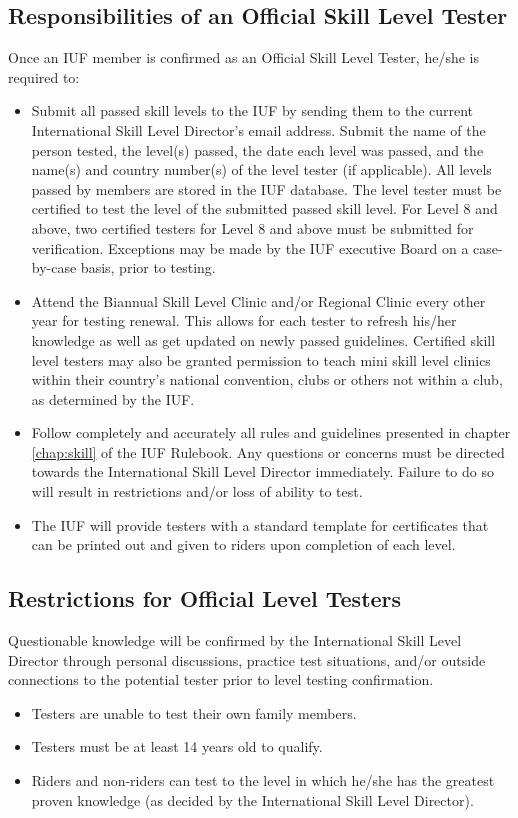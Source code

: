 \subsection{Responsibilities of an Official Skill Level Tester}
Once an IUF member is confirmed as an Official Skill Level Tester, he/she is required to:
\begin{itemize}
\item Submit all passed skill levels to the IUF by sending them to the current International Skill Level Director's email address.
Submit the name of the person tested, the level(s) passed, the date each level was passed, and the name(s) and country number(s) of the level tester (if applicable).
All levels passed by members are stored in the IUF database.
The level tester must be certified to test the level of the submitted passed skill level.
For Level 8 and above, two certified testers for Level 8 and above must be submitted for verification.
Exceptions may be made by the IUF executive Board on a case-by-case basis, prior to testing.
\item Attend the Biannual Skill Level Clinic and/or Regional Clinic every other year for testing renewal.
This allows for each tester to refresh his/her knowledge as well as get updated on newly passed guidelines.
Certified skill level testers may also be granted permission to teach mini skill level clinics within their country's national convention, clubs or others not within a club, as determined by the IUF.
\item Follow completely and accurately all rules and guidelines presented in chapter \ref{chap:skill} of the IUF Rulebook.
Any questions or concerns must be directed towards the International Skill Level Director immediately.
Failure to do so will result in restrictions and/or loss of ability to test.
\item The IUF will provide testers with a standard template for certificates that can be printed out and given to riders upon completion of each level.
\end{itemize}

\subsection{Restrictions for Official Level Testers}
Questionable knowledge will be confirmed by the International Skill Level Director through personal discussions, practice test situations, and/or outside connections to the potential tester prior to level testing confirmation.
\begin{itemize}
\item Testers are unable to test their own family members.
\item Testers must be at least 14 years old to qualify.
\item Riders and non-riders can test to the level in which he/she has the greatest proven knowledge (as decided by the International Skill Level Director).
\end{itemize}

